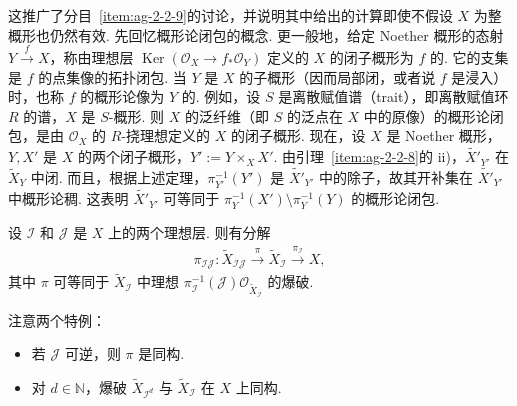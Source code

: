 \begin{numpara}[应用：严格变换是从全变换中去掉例外除子后所得部分的概形论闭包]\label{item:ag-2-2-12}
这推广了分目~\ref{item:ag-2-2-9}的讨论，并说明其中给出的计算即使不假设 $X$ 为整概形也仍然有效.
先回忆概形论闭包的概念. 更一般地，给定 Noether 概形的态射 $Y\xrightarrow f X$，称由理想层 $\operatorname{Ker}(\mathcal O_X\longrightarrow f_*\mathcal O_Y)$ 定义的 $X$ 的闭子概形为 $f$ 的. 它的支集是 $f$ 的点集像的拓扑闭包. 当 $Y$ 是 $X$ 的子概形（因而局部闭，或者说 $f$ 是浸入）时，也称 $f$ 的概形论像为 $Y$ 的. 例如，设 $S$ 是离散赋值谱（trait），即离散赋值环 $R$ 的谱，$X$ 是 $S$-概形. 则 $X$ 的泛纤维（即 $S$ 的泛点在 $X$ 中的原像）的概形论闭包，是由 $\mathcal O_X$ 的 $R$-挠理想定义的 $X$ 的闭子概形.
现在，设 $X$ 是 Noether 概形，$Y,X'$ 是 $X$ 的两个闭子概形，$Y':=Y\times_XX'$. 由引理~\ref{item:ag-2-2-8}的 ii)，$\widetilde{X'}_{Y'}$ 在 $\widetilde X_Y$ 中闭. 而且，根据上述定理，$\pi_{Y'}^{-1}(Y')$ 是 $\widetilde{X'}_{Y'}$ 中的除子，故其开补集在 $\widetilde{X'}_{Y'}$ 中概形论稠. 这表明 $\widetilde{X'}_{Y'}$ 可等同于 $\pi_Y^{-1}(X')\setminus\pi_Y^{-1}(Y)$ 的概形论闭包.
\end{numpara}
\begin{corollary}\label{item:ag-2-2-13}
设 $\mathcal I$ 和 $\mathcal J$ 是 $X$ 上的两个理想层. 则有分解
\begin{align*}
\pi_{\mathcal I\mathcal J}:\widetilde X_{\mathcal I\mathcal J}\xrightarrow{\pi}\widetilde X_{\mathcal I}\xrightarrow{\pi_{\mathcal I}}X,
\end{align*}
其中 $\pi$ 可等同于 $\widetilde X_{\mathcal I}$ 中理想 $\pi_{\mathcal I}^{-1}(\mathcal J)\mathcal O_{\widetilde X_{\mathcal I}}$ 的爆破.
\end{corollary}
注意两个特例：
\begin{itemize}
\item 若 $\mathcal J$ 可逆，则 $\pi$ 是同构.
\item 对 $d\in\mathbb N$，爆破 $\widetilde X_{\mathcal I^d}$ 与 $\widetilde X_{\mathcal I}$ 在 $X$ 上同构.
\end{itemize}
